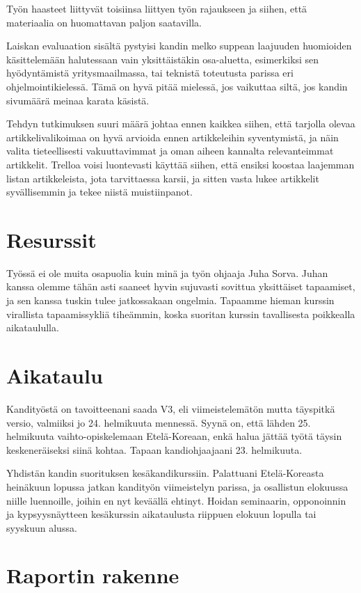 \documentclass[12pt,a4paper,finnish,oneside]{article}
\begin{document}
Työn haasteet liittyvät toisiinsa liittyen työn rajaukseen ja siihen, että materiaalia on huomattavan paljon saatavilla.

Laiskan evaluaation sisältä pystyisi kandin melko suppean laajuuden huomioiden käsittelemään halutessaan vain yksittäistäkin osa-aluetta, esimerkiksi sen hyödyntämistä yritysmaailmassa, tai teknistä toteutusta parissa eri ohjelmointikielessä. Tämä on hyvä pitää mielessä, jos vaikuttaa siltä, jos kandin sivumäärä meinaa karata käsistä.

Tehdyn tutkimuksen suuri määrä johtaa ennen kaikkea siihen, että tarjolla olevaa artikkelivalikoimaa on hyvä arvioida ennen artikkeleihin syventymistä, ja näin valita tieteellisesti vakuuttavimmat ja oman aiheen kannalta relevanteimmat artikkelit. Trelloa voisi luontevasti käyttää siihen, että ensiksi koostaa laajemman listan artikkeleista, jota tarvittaessa karsii, ja sitten vasta lukee artikkelit syvällisemmin ja tekee niistä muistiinpanot.

\section{Resurssit}

Työssä ei ole muita osapuolia kuin minä ja työn ohjaaja Juha Sorva. Juhan kanssa olemme tähän asti saaneet hyvin sujuvasti sovittua yksittäiset tapaamiset, ja sen kanssa tuskin tulee jatkossakaan ongelmia. Tapaamme hieman kurssin virallista tapaamissykliä tiheämmin, koska suoritan kurssin tavallisesta poikkealla aikataululla.

\section{Aikataulu}

Kandityöstä on tavoitteenani saada V3, eli viimeistelemätön mutta täyspitkä versio, valmiiksi jo 24. helmikuuta mennessä. Syynä on, että lähden 25. helmikuuta vaihto-opiskelemaan Etelä-Koreaan, enkä halua jättää työtä täysin keskeneräiseksi siinä kohtaa. Tapaan kandiohjaajaani 23. helmikuuta.

Yhdistän kandin suorituksen kesäkandikurssiin. Palattuani Etelä-Koreasta heinäkuun lopussa jatkan kandityön viimeistelyn parissa, ja osallistun elokuussa niille luennoille, joihin en nyt keväällä ehtinyt. Hoidan seminaarin, opponoinnin ja kypsyysnäytteen kesäkurssin aikataulusta riippuen elokuun lopulla tai syyskuun alussa.

\section{Raportin rakenne} \label{raportinrakenne}
\end{document}
